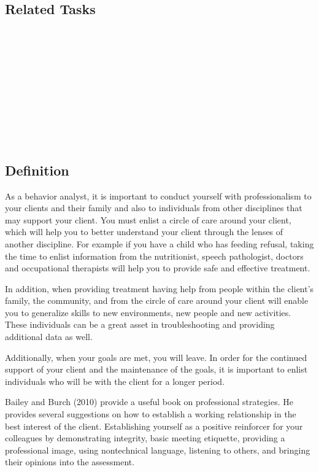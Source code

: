\subsection{Related Tasks}
\fourbOne{}\\
\fourFKFourtySeven{}\\
\fourgOne{}\\
\fourhOne{}\\
\fouriOne{}\\
\fouriFive{}\\
\fouriSix{}\\
\fourjOne{}\\
\fourkSeven{}\\
%
%
%
%
%
%
%
%
%
\section[\fourkEight{}]{\fourkEight{}%
              }
\subsection{Definition}
As a behavior analyst, it is important to conduct yourself with professionalism to your clients and their family and also to individuals from other disciplines that may support your client.  You must enlist a circle of care around your client, which will help you to better understand your client through the lenses of another discipline.  For example if you have a child who has feeding refusal, taking the time to enlist information from the nutritionist, speech pathologist, doctors and occupational therapists will help you to provide safe and effective treatment.

In addition, when providing treatment having help from people within the client's family, the community, and from the circle of care around your client will enable you to generalize skills to new environments, new people and new activities.  These individuals can be a great asset in troubleshooting and providing additional data as well.

Additionally, when your goals are met, you will leave.  In order for the continued support of your client and the maintenance of the goals, it is important to enlist individuals who will be with the client for a longer period.

Bailey and Burch (2010) provide a useful book on professional strategies. He provides several suggestions on how to establish a working relationship in the best interest of the client.  Establishing yourself as a positive reinforcer for your colleagues by demonstrating integrity, basic meeting etiquette, providing a professional image, using nontechnical language, listening to others, and bringing their opinions into the assessment. 
%
